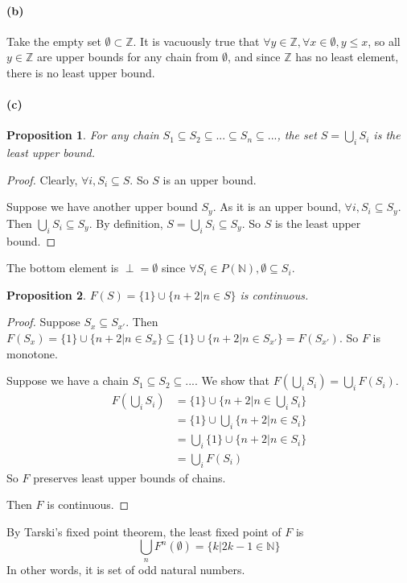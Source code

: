 \documentclass[11pt]{article} %
\newtheorem{prop}{Proposition}
\begin{document}
\paragraph{(b)}
Take the empty set $\emptyset\subset\mathbb{Z}$.
It is vacuously true that $\forall y \in \mathbb{Z}, \forall x\in \emptyset,y\leq x$,
so all $y\in\mathbb{Z}$ are upper bounds for any chain from $\emptyset$,
and since $\mathbb{Z}$ has no least element, there is no least upper bound.

\paragraph{(c)}
\begin{prop}
  For any chain $S_1\subseteq S_2 \subseteq ... \subseteq S_n \subseteq ...$,
  the set $S = \bigcup_i S_i$ is the least upper bound.
\end{prop}
\begin{proof}
  Clearly, $\forall i, S_i \subseteq S$. So $S$ is an upper bound.

  Suppose we have another upper bound $S_y$. 
  As it is an upper bound, $\forall i, S_i \subseteq S_y$.
  Then $\bigcup_i S_i \subseteq S_y$.
  By definition, $S = \bigcup_i S_i \subseteq S_y$. So $S$ is the least upper bound.
\end{proof}

The bottom element is $\perp = \emptyset$ since $\forall S_i\in P(\mathbb{N}), \emptyset \subseteq S_i$.

\begin{prop}
  $F(S)=\{1\} \cup \{n+2|n\in S\}$ is continuous.
\end{prop}
\begin{proof}
  Suppose $S_x \subseteq S_{x'}$.
  Then $F(S_x) = \{1\} \cup \{n+2|n\in S_x\} \subseteq \{1\} \cup \{n+2|n\in S_{x'}\} = F(S_{x'})$.
  So $F$ is monotone.

  Suppose we have a chain $S_1\subseteq S_2 \subseteq ...$.
  We show that $F(\bigcup_i S_i) = \bigcup_i F(S_i)$.
  \begin{equation}
  \begin{aligned}
    F(\bigcup_i S_i) &= \{1\} \cup \{n+2|n\in \bigcup_i S_i\}\\
    &= \{1\} \cup \bigcup_i \{n+2|n\in  S_i\}\\
    &= \bigcup_i \{1\} \cup  \{n+2|n\in  S_i\}\\
    &= \bigcup_i F(S_i)
  \end{aligned}
  \end{equation}
  So $F$ preserves least upper bounds of chains.

  Then $F$ is continuous.

\end{proof}

By Tarski's fixed point theorem, the least fixed point of $F$ is
\[\bigcup_n F^n(\emptyset)=\{k|2k-1\in\mathbb{N}\}\]
In other words, it is set of odd natural numbers.
\end{document}
